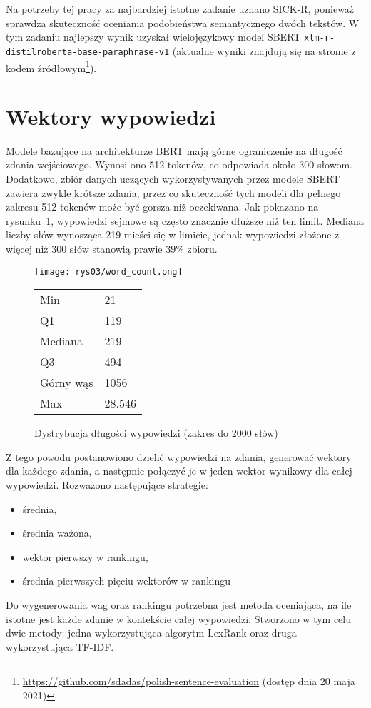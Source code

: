 	Na potrzeby tej pracy za najbardziej istotne zadanie uznano SICK-R, ponieważ sprawdza skuteczność oceniania podobieństwa semantycznego dwóch tekstów.
	W tym zadaniu najlepszy wynik uzyskał wielojęzykowy model SBERT \verb|xlm-r-distilroberta-base-paraphrase-v1|
		(aktualne wyniki znajdują się na stronie z kodem źródłowym\footnote{\url{https://github.com/sdadas/polish-sentence-evaluation} (dostęp dnia 20 maja 2021)}).

\section{Wektory wypowiedzi}\label{sec:sentences}
	Modele bazujące na architekturze BERT mają górne ograniczenie na długość zdania wejściowego.
	Wynosi ono 512 tokenów, co odpowiada około 300 słowom.
	Dodatkowo, zbiór danych uczących wykorzystywanych przez modele SBERT zawiera zwykle krótsze zdania,
		przez co skuteczność tych modeli dla pełnego zakresu 512 tokenów może być gorsza niż oczekiwana.
	Jak pokazano na rysunku~\ref{fig:word_count}, wypowiedzi sejmowe są często znacznie dłuższe niż ten limit.
	Mediana liczby słów wynosząca 219 mieści się w limicie, jednak wypowiedzi złożone z więcej niż 300 słów stanowią prawie 39\% zbioru.
  \begin{figure}[ht]
    \begin{minipage}{.75\textwidth}
      \texttt{[image: rys03/word\_count.png]}
    \end{minipage}%
    \begin{minipage}{.25\textwidth}
      \small
      \begin{tabularx}{\textwidth}{ll}
        Min & 21 \\ 
        Q1 & 119 \\ 
        Mediana & 219 \\
        Q3 & 494 \\ 
        Górny wąs & 1056 \\
        Max & 28.546 \\
      \end{tabularx}
    \end{minipage}
    \caption{Dystrybucja długości wypowiedzi (zakres do 2000 słów)}\label{fig:word_count}
  \end{figure}

	Z tego powodu postanowiono dzielić wypowiedzi na zdania, generować wektory dla każdego zdania, a następnie połączyć je w jeden wektor wynikowy dla całej wypowiedzi.
	Rozważono następujące strategie:
	\begin{itemize}
		\item średnia,
		\item średnia ważona,
		\item wektor pierwszy w rankingu,
		\item średnia pierwszych pięciu wektorów w rankingu
	\end{itemize}
	Do wygenerowania wag oraz rankingu potrzebna jest metoda oceniająca, na ile istotne jest każde zdanie w kontekście całej wypowiedzi.
	Stworzono w tym celu dwie metody: jedna wykorzystująca algorytm LexRank oraz druga wykorzystująca TF-IDF\@.

